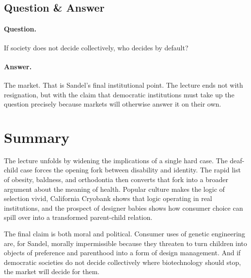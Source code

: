 \subsection{Question \& Answer}

\paragraph{Question.} If society does not decide collectively, who decides by default?

\paragraph{Answer.} The market. That is Sandel's final institutional point. The lecture ends not with resignation, but with the claim that democratic institutions must take up the question precisely because markets will otherwise answer it on their own.

\section{Summary}

The lecture unfolds by widening the implications of a single hard case. The deaf-child case forces the opening fork between disability and identity. The rapid list of obesity, baldness, and orthodontia then converts that fork into a broader argument about the meaning of health. Popular culture makes the logic of selection vivid, California Cryobank shows that logic operating in real institutions, and the prospect of designer babies shows how consumer choice can spill over into a transformed parent-child relation.

The final claim is both moral and political. Consumer uses of genetic engineering are, for Sandel, morally impermissible because they threaten to turn children into objects of preference and parenthood into a form of design management. And if democratic societies do not decide collectively where biotechnology should stop, the market will decide for them.